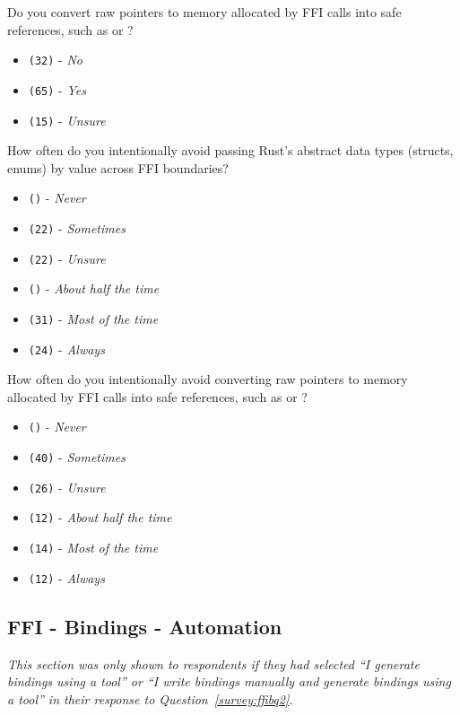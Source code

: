 \begin{protocol}
\begin{itemize}
\end{itemize}
\item \label{survey:ffimmq5}  Do you convert raw pointers to memory allocated by FFI calls into safe references, such as  or ?
\begin{itemize}
\item \texttt{(32)} - \textit{No}
\item \texttt{(65)} - \textit{Yes}
\item \texttt{(15)} - \textit{Unsure}
\end{itemize}
\item \label{survey:ffimmq6}  How often do you intentionally avoid passing Rust's abstract data types (structs, enums) by value across FFI boundaries?
\begin{itemize}
\item \texttt{()} - \textit{Never}
\item \texttt{(22)} - \textit{Sometimes}
\item \texttt{(22)} - \textit{Unsure}
\item \texttt{()} - \textit{About half the time}
\item \texttt{(31)} - \textit{Most of the time}
\item \texttt{(24)} - \textit{Always}
\end{itemize}

\item \label{survey:ffimmq7}  How often do you intentionally avoid converting raw pointers to memory allocated by FFI calls into safe references, such as  or ?
\begin{itemize}
\item \texttt{()} - \textit{Never}
\item \texttt{(40)} - \textit{Sometimes}
\item \texttt{(26)} - \textit{Unsure}
\item \texttt{(12)} - \textit{About half the time}
\item \texttt{(14)} - \textit{Most of the time}
\item \texttt{(12)} - \textit{Always}
\end{itemize}
\end{protocol}

\subsection{FFI - Bindings - Automation}
\label{survey:sec:ffibaq}
\textit{This section was only shown to respondents if they had selected ``\textit{I generate bindings using a tool}'' or ``I write bindings manually and generate bindings using a tool'' in their response to Question~\ref{survey:ffibq2}.}

